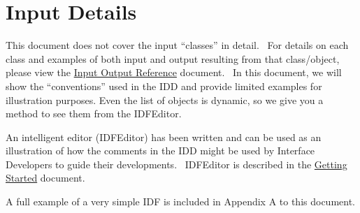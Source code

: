 \chapter{Input Details}\label{input-details}

This document does not cover the input ``classes'' in detail.~ For details on each class and examples of both input and output resulting from that class/object, please view the \href{InputOutputReference.pdf}{Input Output Reference} document.~ In this document, we will show the ``conventions'' used in the IDD and provide limited examples for illustration purposes. Even the list of objects is dynamic, so we give you a method to see them from the IDFEditor.

An intelligent editor (IDFEditor) has been written and can be used as an illustration of how the comments in the IDD might be used by Interface Developers to guide their developments.~ IDFEditor is described in the \href{GettingStarted.pdf}{Getting Started} document.

A full example of a very simple IDF is included in Appendix A to this document.

